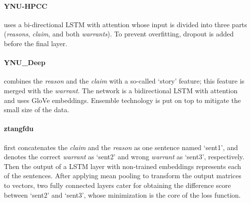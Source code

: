 \paragraph{YNU-HPCC}
uses a bi-directional LSTM with attention whose input is divided into three parts (\emph{reasons}, \emph{claim}, and both \emph{warrants}). To prevent overfitting, dropout is added before the final layer.


\paragraph{YNU\_Deep}
combines the \emph{reason} and the \emph{claim} with a so-called `story' feature; this feature is merged with the \emph{warrant}. The network is a bidirectional LSTM with attention and uses GloVe embeddings. Ensemble technology is put on top to mitigate the small size of the data.


\paragraph{ztangfdu}
first concatenates the \emph{claim} and the \emph{reason} as one sentence named `sent1', and denotes the correct \emph{warrant} as `sent2' and wrong \emph{warrant} as `sent3', respectively. Then the output of a LSTM layer with non-trained embeddings represents each of the sentences. After applying mean pooling to transform the output matrices to vectors, two fully connected layers cater for obtaining the difference score between `sent2' and `sent3', whose minimization is the core of the loss function.

